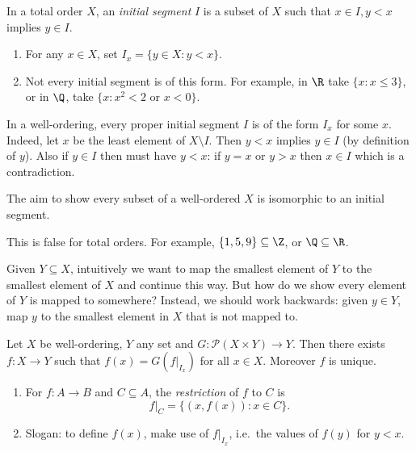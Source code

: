 \documentclass[a4paper]{article}
\begin{document}
\begin{definition}
  In a total order \(X\), an \emph{initial segment} \(I\) is a subset of \(X\) such that \(x \in I, y < x\) implies \(y \in I\).
\end{definition}

\begin{eg}\leavevmode
  \begin{enumerate}
  \item For any \(x \in X\), set \(I_x = \{y \in X: y < x\}\).
  \item Not every initial segment is of this form. For example, in \(\R\) take \(\{x: x \leq 3\}\), or in \(\Q\), take \(\{x: x^2 < 2 \text{ or } x < 0\}\).
  \end{enumerate}
\end{eg}

\begin{note}
  In a well-ordering, every proper initial segment \(I\) is of the form \(I_x\) for some \(x\). Indeed, let \(x\) be the least element of \(X \setminus I\). Then \(y < x\) implies \(y \in I\) (by definition of \(y\)). Also if \(y \in I\) then must have \(y < x\): if \(y = x\) or \(y > x\) then \(x \in I\) which is a contradiction.
\end{note}

The aim to show every subset of a well-ordered \(X\) is isomorphic to an initial segment.

\begin{note}
  This is false for total orders. For example, \(\{1, 5, 9\} \subseteq \Z\), or \(\Q \subseteq \R\).
\end{note}

Given \(Y \subseteq X\), intuitively we want to map the smallest element of \(Y\) to the smallest element of \(X\) and continue this way. But how do we show every element of \(Y\) is mapped to somewhere? Instead, we should work backwards: given  \(y \in Y\), map \(y\) to the smallest element in \(X\) that is not mapped to.

\begin{theorem}
  Let \(X\) be well-ordering, \(Y\) any set and \(G: \mathcal P(X \times Y) \to Y\). Then there exists \(f: X \to Y\) such that \(f(x) = G(f|_{I_x})\) for all \(x \in X\). Moreover \(f\) is unique.
\end{theorem}

\begin{note}\leavevmode
  \begin{enumerate}
  \item For \(f: A \to B\) and \(C \subseteq A\), the \emph{restriction} of \(f\) to \(C\) is
    \[
      f|_C = \{(x, f(x)): x \in C\}.
    \]
  \item Slogan: to define \(f(x)\), make use of \(f|_{I_x}\), i.e.\ the values of \(f(y)\) for \(y < x\).
  \end{enumerate}
\end{note}
\end{document}
